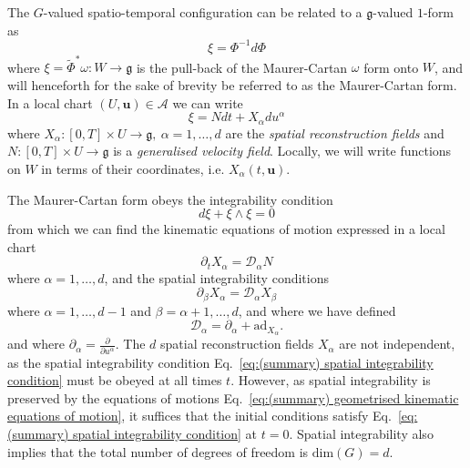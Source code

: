 The $G$-valued spatio-temporal configuration can be related to a $\mathfrak{g}$-valued $1$-form as
\begin{equation} \label{eq:(summary) Phi from xi}
\xi = \Phi^{-1} d \Phi
\end{equation}
where $\xi = \tilde{\Phi}^* \omega : W \to \mathfrak{g}$ is the pull-back of the Maurer-Cartan $\omega$ form onto $W$, and will henceforth for the sake of brevity be referred to as the Maurer-Cartan form. In a local chart $(U, \mathbf{u}) \in \mathcal{A}$ we can write
\begin{equation} \label{eq:xi in basis}
\xi = N dt + X_\alpha d u^\alpha
\end{equation}
where $X_\alpha : [0, T] \times U \to \mathfrak{g},\ \alpha = 1,\dots,d$ are the \textit{spatial reconstruction fields} and $N : [0, T] \times U \to \mathfrak{g}$ is a \textit{generalised velocity field}. Locally, we will write functions on $W$ in terms of their coordinates, i.e. $X_\alpha(t, \mathbf{u})$.

The Maurer-Cartan form obeys the integrability condition
\begin{equation}
d \xi + \xi \wedge \xi = 0
\end{equation}
from which we can find the kinematic equations of motion expressed in a local chart
\begin{equation} \label{eq:(summary) geometrised kinematic equations of motion}
\partial_t X_\alpha  = \mathcal{D}_\alpha N
\end{equation}
where $\alpha = 1, \dots, d$, and the spatial integrability conditions
\begin{equation} \label{eq:(summary) spatial integrability condition}
\partial_\beta X_\alpha = \mathcal{D}_\alpha X_\beta
\end{equation}
where $\alpha = 1, \dots, d-1$ and $\beta = \alpha+1, \dots, d$, and where we have defined
\begin{equation}
\mathcal{D}_\alpha = \partial_{\alpha} + \text{ad}_{X_\alpha}.
\end{equation}
and where $\partial_\alpha = \frac{\partial}{\partial u^\alpha}$. The $d$ spatial reconstruction fields $X_\alpha$ are not independent, as the spatial integrability condition Eq.~\ref{eq:(summary) spatial integrability condition} must be obeyed at all times $t$. However, as spatial integrability is preserved by the equations of motions Eq.~\ref{eq:(summary) geometrised kinematic equations of motion}, it suffices that the initial conditions satisfy Eq.~\ref{eq:(summary) spatial integrability condition} at $t=0$. Spatial integrability also implies that the total number of degrees of freedom is $\text{dim}(G) = d$.

